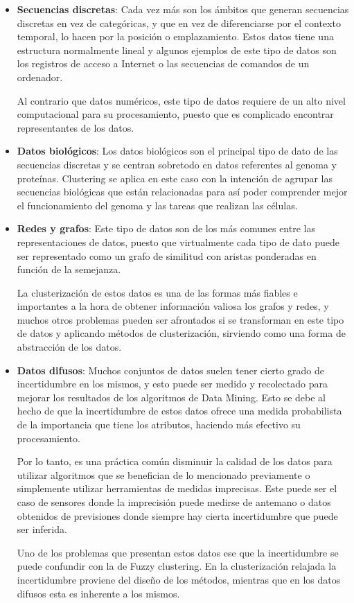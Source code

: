 \documentclass[10pt, a4paper]{article}
\begin{document}
\begin{itemize}
  \item \textbf{Secuencias discretas}: Cada vez más son los ámbitos que generan secuencias discretas en vez de categóricas, y que en vez de diferenciarse por el contexto temporal, lo hacen por la posición o emplazamiento. Estos datos tiene una estructura normalmente lineal y algunos ejemplos de este tipo de datos son los registros de acceso a Internet o las secuencias de comandos de un ordenador. 
  
  Al contrario que datos numéricos, este tipo de datos requiere de un alto nivel computacional para su procesamiento, puesto que es complicado encontrar representantes de los datos.
  
  \item \textbf{Datos biológicos}: Los datos biológicos son el principal tipo de dato de las secuencias discretas y se centran sobretodo en datos referentes al genoma y proteínas. Clustering se aplica en este caso con la intención de agrupar las secuencias biológicas que están relacionadas para así poder comprender mejor el funcionamiento del genoma y las tareas que realizan las células.
  
  \item \textbf{Redes y grafos}: Este tipo de datos son de los más comunes entre las representaciones de datos, puesto que virtualmente cada tipo de dato puede ser representado como un grafo de similitud con aristas ponderadas en función de la semejanza. 
  
  La clusterización de estos datos es una de las formas más fiables e importantes a la hora de obtener información valiosa los grafos y redes, y muchos otros problemas pueden ser afrontados si se transforman en este tipo de datos y aplicando métodos de clusterización, sirviendo como una forma de abstracción de los datos.
  
  \item \textbf{Datos difusos}: Muchos conjuntos de datos suelen tener cierto grado de incertidumbre en los mismos, y esto puede ser medido y recolectado para mejorar los resultados de los algoritmos de Data Mining. Esto se debe al hecho de que la incertidumbre de estos datos ofrece una medida probabilista de la importancia que tiene los atributos, haciendo más efectivo su procesamiento. 
  
  Por lo tanto, es una práctica común disminuir la calidad de los datos para utilizar algoritmos que se benefician de lo mencionado previamente o simplemente utilizar herramientas de medidas imprecisas. Este puede ser el caso de sensores donde la imprecisión puede medirse de antemano o datos obtenidos de previsiones donde siempre hay cierta incertidumbre que puede ser inferida.
  
  Uno de los problemas que presentan estos datos ese que la incertidumbre se puede confundir con la de Fuzzy clustering. En la clusterización relajada la incertidumbre proviene del diseño de los métodos, mientras que en los datos difusos esta es inherente a los mismos.
   
\end{itemize}
\end{document}
